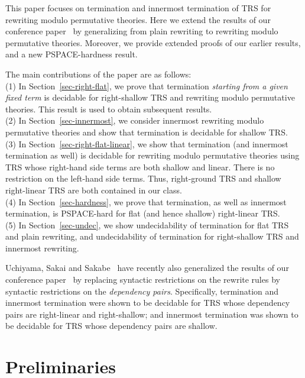 \documentclass{LMCS}
\theoremstyle{plain}
\begin{document}
This paper focuses on termination and innermost termination of TRS
for rewriting modulo permutative theories.
Here we extend the results of our conference
paper~\cite{DBLP:conf/rta/GodoyHT07} by generalizing from
plain rewriting to rewriting modulo permutative theories.
Moreover, 
we provide extended proofs of our earlier results, and
a new PSPACE-hardness result.

The main contributions of the paper are as follows:
\\ (1)
In Section~\ref{sec-right-flat}, we prove that
termination {\em starting from a given fixed term}
is decidable for right-shallow TRS and rewriting modulo permutative theories.
This result is used to obtain subsequent results. \\ (2)
In Section~\ref{sec-innermost},
we consider innermost rewriting modulo permutative
theories and show that termination is decidable for shallow TRS.
\\ (3)
In Section~\ref{sec-right-flat-linear}, we show that 
termination (and innermost termination as well) is decidable
for rewriting modulo permutative theories using TRS whose
right-hand side terms are both shallow and linear.
There is no restriction on the left-hand
side terms. Thus, right-ground TRS and shallow
right-linear TRS are both contained in our class.
\\ (4)
In Section~\ref{sec-hardness}, we prove that termination,
as well as innermost termination, is PSPACE-hard for
flat (and hence shallow) right-linear TRS.
\\ (5)
In Section~\ref{sec-undec},
we show undecidability of termination for
flat TRS and plain rewriting, and
undecidability of termination for right-shallow TRS
and innermost rewriting.


Uchiyama, Sakai and Sakabe~\cite{Sakai} have recently also 
generalized the results of our conference 
paper~\cite{DBLP:conf/rta/GodoyHT07} by replacing
syntactic restrictions on the rewrite rules by 
syntactic restrictions on the {\em{dependency pairs}}.
Specifically, termination and innermost termination were
shown to be decidable for TRS whose {dependency
pairs} are right-linear and right-shallow; and
innermost  termination was shown to be decidable for
TRS whose dependency pairs are shallow. 


\section{Preliminaries}\label{sec-preliminaries}
\end{document}
